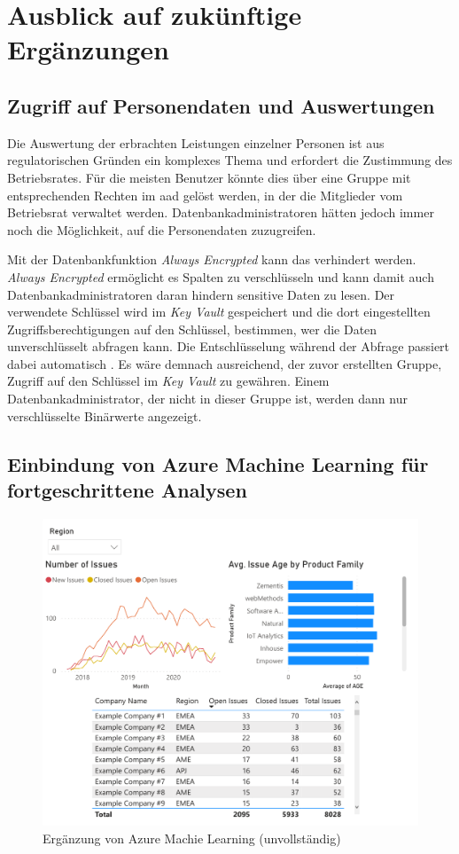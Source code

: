 \section{Ausblick auf zukünftige Ergänzungen} \label{sec:praktischeUmsetzung:ausblick}

\subsection{Zugriff auf Personendaten und Auswertungen}
Die Auswertung der erbrachten Leistungen einzelner Personen ist aus regulatorischen Gründen ein komplexes Thema und erfordert die Zustimmung des Betriebsrates. Für die meisten Benutzer könnte dies über eine Gruppe mit entsprechenden Rechten im \ac{aad} gelöst werden, in der die Mitglieder vom Betriebsrat verwaltet werden. Datenbankadministratoren hätten jedoch immer noch die Möglichkeit, auf die Personendaten zuzugreifen. 

Mit der Datenbankfunktion \textit{Always Encrypted} kann das verhindert werden. \textit{Always Encrypted} ermöglicht es Spalten zu verschlüsseln und kann damit auch Datenbankadministratoren daran hindern sensitive Daten zu lesen. Der verwendete Schlüssel wird im \textit{Key Vault} gespeichert und die dort eingestellten Zugriffsberechtigungen auf den Schlüssel, bestimmen, wer die Daten unverschlüsselt abfragen kann. Die Entschlüsselung während der Abfrage passiert dabei automatisch \cite{mauri_practical_2021}. Es wäre demnach ausreichend, der zuvor erstellten Gruppe, Zugriff auf den Schlüssel im \textit{Key Vault} zu gewähren. Einem Datenbankadministrator, der nicht in dieser Gruppe ist, werden dann nur verschlüsselte Binärwerte angezeigt. 

\subsection{Einbindung von Azure Machine Learning für fortgeschrittene Analysen} \label{sec:praktischeUmsetzung:ausblick:aml}

\begin{figure}[htbp]
 \centering
 \includegraphics[width=\textwidth]{gfx/pbi_report.pdf}
 \caption[Azure Machine Learning]{Ergänzung von Azure Machie Learning (unvollständig)}
\label{fig:praktischeUmsetzung:ausblick:aml}
\end{figure}